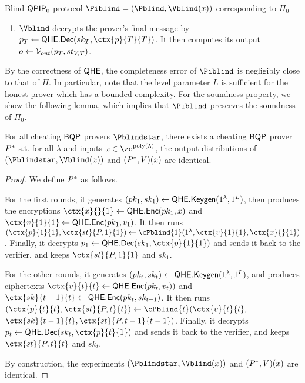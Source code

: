 \begin{protocol}{Blind $\operatorname{\mathsf{QPIP}}_0$ protocol $\Piblind=(\Pblind, \Vblind(x))$ corresponding to $\Pi_0$}
\begin{enumerate}
\begin{enumerate}
                that is, it encrypts its state under the new key by $\ctx{st}{P, t-1}{t-1, t}\leftarrow\QEnc(pk_t, \ctx{st}{P, t-1}{t-1}))$,
                then homomorphically decrypts the old encryption by
                $\ctx{st}{P, t-1}{t}\leftarrow\QEval(pk_t, \QDec,$ \ $\ctx{sk}{t-1}{t}, \ctx{st}{P, t-1}{t-1, t})$.
                Then it applies the next-message function homomorphically, generating
                $(\ctx{p}{t}{t}, \ctx{st}{P, t}{t})\leftarrow\QEval(pk_t, \cP_t, \ctx{v}{t}{t}, \ctx{st}{P, t-1}{t})$.
                It sends $\ctx{p}{t}{t}$ back to the verifier.
        \end{enumerate}
        \item $\Vblind$ decrypts the prover's final message by $p_T\leftarrow\QDec(sk_T, \ctx{p}{T}{T})$.
            It then computes its output $o\leftarrow\mathcal{V}_{out}(p_T, st_{V, T})$.
    \end{enumerate}
\end{protocol}

By the correctness of $\mathsf{QHE}$, the completeness error of $\Piblind$ is negligibly close to that of $\Pi$.
In particular, note that the level parameter $L$ is sufficient for the honest prover which has a bounded complexity.
For the soundness property, we show the following lemma, which implies that $\Piblind$ preserves the soundness of $\Pi_0$.

\begin{thm} \label{thm:compiler-errors}
    For all cheating $\operatorname{\mathsf{BQP}}$ provers $\Pblindstar$, there exists a cheating $\operatorname{\mathsf{BQP}}$ prover $P^*$ s.t. for all $\lambda$ and inputs $x\in\zo^{\poly(\lambda)}$, the output distributions of $(\Pblindstar, \Vblind(x))$ and $(P^*, V)(x)$ are identical.
\end{thm}
\begin{proof}
    We define $P^*$ as follows.
    
    For the first rounds, it generates
    $(pk_1, sk_1)\leftarrow\mathsf{QHE.Keygen}(1^\lambda, 1^L)$, then produces the encryptions
    $\ctx{x}{}{1}\leftarrow\QEnc(pk_1, x)$ and $\ctx{v}{1}{1}\leftarrow\QEnc(pk_1, v_1)$.
    It then runs $(\ctx{p}{1}{1}, \ctx{st}{P, 1}{1})\leftarrow\cPblind{1}(1^\lambda, \ctx{v}{1}{1}, \ctx{x}{}{1})$.
    Finally, it decrypts $p_1\leftarrow\QDec(sk_1, \ctx{p}{1}{1})$ and sends it back to the verifier,
    and keeps $\ctx{st}{P, 1}{1}$ and $sk_1$.

    For the other rounds, it generates
    $(pk_t, sk_t)\leftarrow\mathsf{QHE.Keygen}(1^\lambda, 1^L)$, and produces ciphertexts
    $\ctx{v}{t}{t}\leftarrow\QEnc(pk_t, v_t))$ and $\ctx{sk}{t-1}{t}\leftarrow\QEnc(pk_t, sk_{t-1})$.
    It then runs $(\ctx{p}{t}{t}, \ctx{st}{P, t}{t})\leftarrow\cPblind{t}(\ctx{v}{t}{t},$ \ $\ctx{sk}{t-1}{t}, \ctx{st}{P, t-1}{t-1})$.
    Finally, it decrypts $p_t\leftarrow\QDec(sk_t, \ctx{p}{t}{1})$ and sends it back to the verifier,
    and keeps $\ctx{st}{P, t}{t}$ and $sk_t$.
        
    By construction, the experiments $(\Pblindstar, \Vblind(x))$ and $(P^*, V)(x)$ are identical.
\end{proof}

